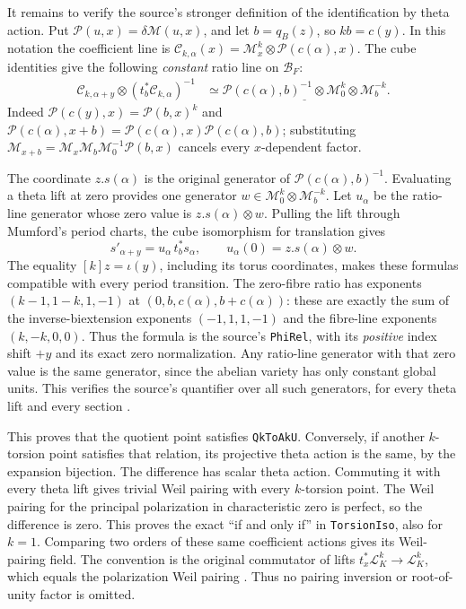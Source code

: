 It remains to verify the source's stronger definition of the
identification by theta action.  Put
$\mathscr P(u,x)=\delta\mathscr M(u,x)$, and let $b=q_B(z)$,
so $kb=c(y)$.  In this notation the coefficient line is
$\mathscr C_{k,\alpha}(x)=\mathscr M_x^k\otimes
\mathscr P(c(\alpha),x)$.  The cube identities give the following
\emph{constant} ratio line on $\mathcal B_F$:
\[
 \begin{split}
 \mathscr C_{k,\alpha+y}\otimes
           (t_b^*\mathscr C_{k,\alpha})^{-1}
 &\simeq
 \underline{\mathscr P(c(\alpha),b)^{-1}
                  \otimes\mathscr M_0^k\otimes\mathscr M_b^{-k}}.
 \end{split}
\]
Indeed $\mathscr P(c(y),x)=\mathscr P(b,x)^k$ and
$\mathscr P(c(\alpha),x+b)=
\mathscr P(c(\alpha),x)\mathscr P(c(\alpha),b)$;
substituting
$\mathscr M_{x+b}=\mathscr M_x\mathscr M_b\mathscr M_0^{-1}
\mathscr P(b,x)$ cancels every $x$-dependent factor.

The coordinate $z.s(\alpha)$ is the original generator of
$\mathscr P(c(\alpha),b)^{-1}$.  Evaluating a theta lift at zero
provides one generator
$w\in\mathscr M_0^k\otimes\mathscr M_b^{-k}$.
Let $u_\alpha$ be the ratio-line generator whose zero value is
$z.s(\alpha)\otimes w$.  Pulling the lift through Mumford's
period charts, the cube isomorphism for translation gives
\[
             s'_{\alpha+y}=u_\alpha\,t_b^*s_\alpha,
 \qquad u_\alpha(0)=z.s(\alpha)\otimes w.
\]
The equality $[k]z=\iota(y)$, including its torus coordinates,
makes these formulas compatible with every period transition.
The zero-fibre ratio has exponents
$(k-1,1-k,1,-1)$ at $(0,b,c(\alpha),b+c(\alpha))$:
these are exactly the sum of the inverse-biextension exponents
$(-1,1,1,-1)$ and the fibre-line exponents $(k,-k,0,0)$.
Thus the formula is the source's \texttt{PhiRel}, with its
\emph{positive} index shift $+y$ and its exact zero normalization.
Any ratio-line generator with that zero value is the same generator,
since the abelian variety has only constant global units.  This
verifies the source's quantifier over all such generators, for
every theta lift and every section
\cite[Section 5.2.5]{dvr-unif-lan}.

This proves that the quotient point satisfies \texttt{QkToAkU}.
Conversely, if another $k$-torsion point satisfies that relation, its
projective theta action is the same, by the expansion bijection.
The difference has scalar theta action.  Commuting it with every
theta lift gives trivial Weil pairing with every $k$-torsion point.
The Weil pairing for the principal polarization in characteristic
zero is perfect, so the difference is zero.  This proves the exact
``if and only if'' in \texttt{TorsionIso}, also for $k=1$.
Comparing two orders of these same coefficient actions gives its
Weil-pairing field.  The convention is the original commutator of
lifts $t_x^*\mathscr L_K^k\to\mathscr L_K^k$, which equals the
polarization Weil pairing
\cite[Proposition 5.2.4.9]{dvr-unif-lan}.
Thus no pairing inversion or root-of-unity factor is omitted.

